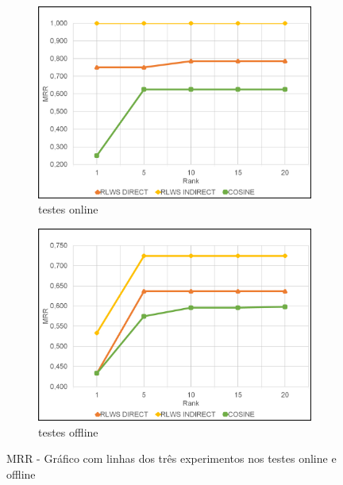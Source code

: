 \begin{figure}
    \begin{subfigure}{.5\textwidth}
        \centering
        \includegraphics[width=.8\linewidth]{imagens/mrr_results_online.jpg}
        \caption{testes online}
        \label{fig:mrr_line_a}
    \end{subfigure}%
    \begin{subfigure}{.5\textwidth}
        \centering
        \includegraphics[width=.8\linewidth]{imagens/mrr_results_offline.jpg}
        \caption{testes offline}
        \label{fig:mrr_line_b}
    \end{subfigure}
    \caption{MRR - Gráfico com linhas dos três experimentos nos testes online e offline}
    \label{fig:mrr_line}
\end{figure}

